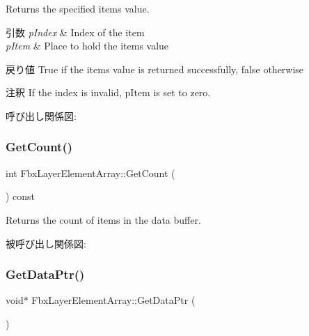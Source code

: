 Returns the specified item\textquotesingle{}s value. 
\begin{DoxyParams}{引数}
{\em p\+Index} & Index of the item \\
\hline
{\em p\+Item} & Place to hold the item\textquotesingle{}s value \\
\hline
\end{DoxyParams}
\begin{DoxyReturn}{戻り値}
{\ttfamily True} if the item\textquotesingle{}s value is returned successfully, {\ttfamily false} otherwise 
\end{DoxyReturn}
\begin{DoxyRemark}{注釈}
If the index is invalid, p\+Item is set to zero. 
\end{DoxyRemark}
呼び出し関係図\+:
\mbox{\label{class_fbx_layer_element_array_acd195095246f6d886d55fd0aa7129b2d}} 
\subsubsection{\texorpdfstring{Get\+Count()}{GetCount()}}
{\footnotesize\ttfamily int Fbx\+Layer\+Element\+Array\+::\+Get\+Count (\begin{DoxyParamCaption}{ }\end{DoxyParamCaption}) const}



Returns the count of items in the data buffer. 

被呼び出し関係図\+:
\mbox{\label{class_fbx_layer_element_array_a5bd7bc19029950341e907616172ceefd}} 
\subsubsection{\texorpdfstring{Get\+Data\+Ptr()}{GetDataPtr()}}
{\footnotesize\ttfamily void$\ast$ Fbx\+Layer\+Element\+Array\+::\+Get\+Data\+Ptr (\begin{DoxyParamCaption}{ }\end{DoxyParamCaption})\hspace{0.3cm}{\ttfamily [protected]}}

